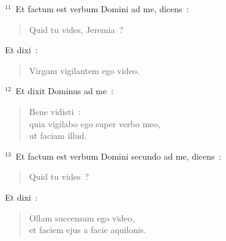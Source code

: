 ${}^{11}$~Et factum est verbum Domini ad me, dicens~: \begin{flushleft}\begin{verse}Quid tu vides, Jeremia~?\end{verse}\end{flushleft}

 Et dixi~: \begin{flushleft}\begin{verse}Virgam vigilantem ego video.\end{verse}\end{flushleft}


${}^{12}$~Et dixit Dominus ad me~: \begin{flushleft}\begin{verse}Bene vidisti~:\\ quia vigilabo ego super verbo meo,\\ ut faciam illud.\end{verse}\end{flushleft}


${}^{13}$~Et factum est verbum Domini secundo ad me, dicens~: \begin{flushleft}\begin{verse}Quid tu vides~?\end{verse}\end{flushleft}

 Et dixi~: \begin{flushleft}\begin{verse}Ollam succensam ego video,\\ et faciem ejus a facie aquilonis.\end{verse}\end{flushleft}


